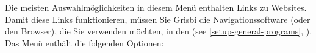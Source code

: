 Die meisten Auswahlmöglichkeiten in diesem Menü enthalten Links zu Websites. Damit diese Links funktionieren, müssen Sie Grisbi die Navigationssoftware (oder den Browser), die Sie verwenden möchten, in den  (see \vref{setup-general-programs}, ). Das Menü  enthält die folgenden Optionen:

